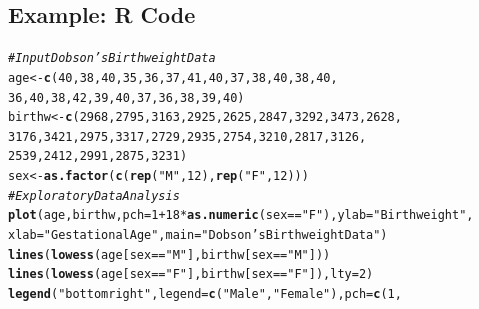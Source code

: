 \documentclass[oneside]{book}\usepackage[]{graphicx}\usepackage[svgnames]{xcolor}
\makeatletter
\newcommand{\hlnum}[1]{\textcolor[rgb]{0.686,0.059,0.569}{#1}}%
\newcommand{\hlstr}[1]{\textcolor[rgb]{0.192,0.494,0.8}{#1}}%
\newcommand{\hlcom}[1]{\textcolor[rgb]{0.678,0.584,0.686}{\textit{#1}}}%
\newcommand{\hlopt}[1]{\textcolor[rgb]{0,0,0}{#1}}%
\newcommand{\hlstd}[1]{\textcolor[rgb]{0.345,0.345,0.345}{#1}}%
\newcommand{\hlkwb}[1]{\textcolor[rgb]{0.69,0.353,0.396}{#1}}%
\newcommand{\hlkwc}[1]{\textcolor[rgb]{0.333,0.667,0.333}{#1}}%
\newcommand{\hlkwd}[1]{\textcolor[rgb]{0.737,0.353,0.396}{\textbf{#1}}}%
\newenvironment{kframe}{%
 \def\at@end@of@kframe{}%
 \ifinner\ifhmode%
  \def\at@end@of@kframe{\end{minipage}}%
  \begin{minipage}{\columnwidth}%
 \fi\fi%
 \def\FrameCommand##1{\hskip\@totalleftmargin \hskip-\fboxsep
 \colorbox{shadecolor}{##1}\hskip-\fboxsep
     \hskip-\linewidth \hskip-\@totalleftmargin \hskip\columnwidth}%
 \MakeFramed {\advance\hsize-\width
   \@totalleftmargin\z@ \linewidth\hsize
   \@setminipage}}%
 {\par\unskip\endMakeFramed%
 \at@end@of@kframe}
\newenvironment{knitrout}{}{} %
\makeatother
\begin{document}
\subsection*{Example: R Code}
\begin{knitrout}
\color{fgcolor}\begin{kframe}
\begin{alltt}
\hlcom{# Input Dobson's Birthweight Data}
\hlstd{age} \hlkwb{<-} \hlkwd{c}\hlstd{(}\hlnum{40}\hlstd{,} \hlnum{38}\hlstd{,} \hlnum{40}\hlstd{,} \hlnum{35}\hlstd{,} \hlnum{36}\hlstd{,} \hlnum{37}\hlstd{,} \hlnum{41}\hlstd{,} \hlnum{40}\hlstd{,} \hlnum{37}\hlstd{,} \hlnum{38}\hlstd{,} \hlnum{40}\hlstd{,} \hlnum{38}\hlstd{,} \hlnum{40}\hlstd{,}
  \hlnum{36}\hlstd{,} \hlnum{40}\hlstd{,} \hlnum{38}\hlstd{,} \hlnum{42}\hlstd{,} \hlnum{39}\hlstd{,} \hlnum{40}\hlstd{,} \hlnum{37}\hlstd{,} \hlnum{36}\hlstd{,} \hlnum{38}\hlstd{,} \hlnum{39}\hlstd{,} \hlnum{40}\hlstd{)}
\hlstd{birthw} \hlkwb{<-} \hlkwd{c}\hlstd{(}\hlnum{2968}\hlstd{,} \hlnum{2795}\hlstd{,} \hlnum{3163}\hlstd{,} \hlnum{2925}\hlstd{,} \hlnum{2625}\hlstd{,} \hlnum{2847}\hlstd{,} \hlnum{3292}\hlstd{,} \hlnum{3473}\hlstd{,} \hlnum{2628}\hlstd{,}
  \hlnum{3176}\hlstd{,} \hlnum{3421}\hlstd{,} \hlnum{2975}\hlstd{,} \hlnum{3317}\hlstd{,} \hlnum{2729}\hlstd{,} \hlnum{2935}\hlstd{,} \hlnum{2754}\hlstd{,} \hlnum{3210}\hlstd{,} \hlnum{2817}\hlstd{,} \hlnum{3126}\hlstd{,}
  \hlnum{2539}\hlstd{,} \hlnum{2412}\hlstd{,} \hlnum{2991}\hlstd{,} \hlnum{2875}\hlstd{,} \hlnum{3231}\hlstd{)}
\hlstd{sex} \hlkwb{<-} \hlkwd{as.factor}\hlstd{(}\hlkwd{c}\hlstd{(}\hlkwd{rep}\hlstd{(}\hlstr{"M"}\hlstd{,} \hlnum{12}\hlstd{),} \hlkwd{rep}\hlstd{(}\hlstr{"F"}\hlstd{,} \hlnum{12}\hlstd{)))}
\hlcom{# Exploratory Data Analysis}
\hlkwd{plot}\hlstd{(age, birthw,} \hlkwc{pch} \hlstd{=} \hlnum{1} \hlopt{+} \hlnum{18} \hlopt{*} \hlkwd{as.numeric}\hlstd{(sex} \hlopt{==} \hlstr{"F"}\hlstd{),} \hlkwc{ylab} \hlstd{=} \hlstr{"Birthweight"}\hlstd{,}
  \hlkwc{xlab} \hlstd{=} \hlstr{"Gestational Age"}\hlstd{,} \hlkwc{main} \hlstd{=} \hlstr{"Dobson's Birthweight Data"}\hlstd{)}
\hlkwd{lines}\hlstd{(}\hlkwd{lowess}\hlstd{(age[sex} \hlopt{==} \hlstr{"M"}\hlstd{], birthw[sex} \hlopt{==} \hlstr{"M"}\hlstd{]))}
\hlkwd{lines}\hlstd{(}\hlkwd{lowess}\hlstd{(age[sex} \hlopt{==} \hlstr{"F"}\hlstd{], birthw[sex} \hlopt{==} \hlstr{"F"}\hlstd{]),} \hlkwc{lty} \hlstd{=} \hlnum{2}\hlstd{)}
\hlkwd{legend}\hlstd{(}\hlstr{"bottomright"}\hlstd{,} \hlkwc{legend} \hlstd{=} \hlkwd{c}\hlstd{(}\hlstr{"Male"}\hlstd{,} \hlstr{"Female"}\hlstd{),} \hlkwc{pch} \hlstd{=} \hlkwd{c}\hlstd{(}\hlnum{1}\hlstd{,}

\end{alltt}
\end{kframe}
\end{knitrout}
\end{document}
